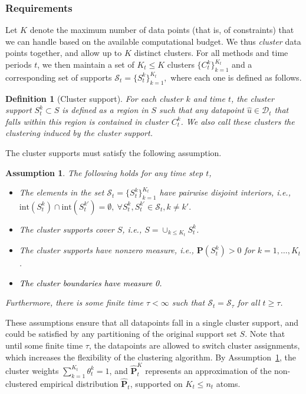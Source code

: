 \documentclass[12pt]{article}
\newcommand{\ie}{{\it i.e.}}
\newcommand{\prob}{{\mathbf P}}
\newcommand{\supp}{S}
\newtheorem{assumption}{Assumption}[section]
\newtheorem{definition}{Definition}[section]
\newcommand{\RC}[1]{\textcolor{black}{#1}}
\newcommand{\RC}[1]{\textcolor{blue}{#1}}
\begin{document}
\subsubsection{Requirements}
Let $K$ denote the maximum number of data points (that is, of constraints) that we can handle based on the available computational budget.
We thus {\it cluster} data points together, and allow up to $K$ distinct clusters. 
For all methods and time periods $t$, we then maintain a set of $K_t \leq K$ clusters $\{C_t^k\}_{k=1}^{K_t}$ and a corresponding set of supports $\mathcal{S}_t = \{S_t^k\}_{k=1}^{K_t},$  where each one is defined as follows.
\begin{definition}[Cluster support]
\label{def:cluster_supp}
    For each cluster $k$ and time $t$, the {\it cluster support} $S_t^k \subset S$ is defined as a region in $S$ such that any datapoint $\hat{u} \in \mathcal{D}_t$ that falls within this region is contained in cluster $C_t^k$.
    We also call these clusters the clustering induced by the cluster support. 
\end{definition}
The cluster supports must satisfy the following assumption. 
\begin{assumption}
\label{ass:support}
The following holds for any time step $t$,
\begin{itemize}
    \item The elements in the set $\mathcal{S}_t = \{S_t^k\}_{k=1}^{K_t}$ have pairwise disjoint interiors, \ie, $ \mathrm{int}(S^k_t) \cap \mathrm{int}(S^{k'}_t) = \emptyset,~\forall S_t^k,S_t^{k'}\in \mathcal{S}_t, k \neq k'.$
    \item The cluster supports cover $S$, \ie, $S  = \cup_{k\leq K_t}S_t^k$.
    \item The cluster supports have nonzero measure, \ie, $\prob(S^k_t) > 0$ for $k=1,\dots,K_t$.
    \item \RC{The cluster boundaries have measure 0.}
\end{itemize}
Furthermore, there is some finite time $\tau < \infty$ such that $\mathcal{S}_t = \mathcal{S}_\tau$ for all $t \geq \tau$.
    \end{assumption}
\ifpreprint These assumptions ensure that all datapoints fall in a single cluster support, and could be satisfied by any partitioning of the original support set $\supp$. \fi Note that until some finite time $\tau$, the datapoints are allowed to switch cluster assignments, which increases the flexibility of the clustering algorithm. 
By Assumption~\ref{ass:support}, the cluster weights $\sum_{k=1}^{K_t}\theta^k_t = 1$, and $\hat{\mathbf{P}}^K_t$ represents an approximation of the non-clustered empirical distribution $\hat{\mathbf{P}}_t$, supported on $K_t \leq n_t$ atoms.
\end{document}
